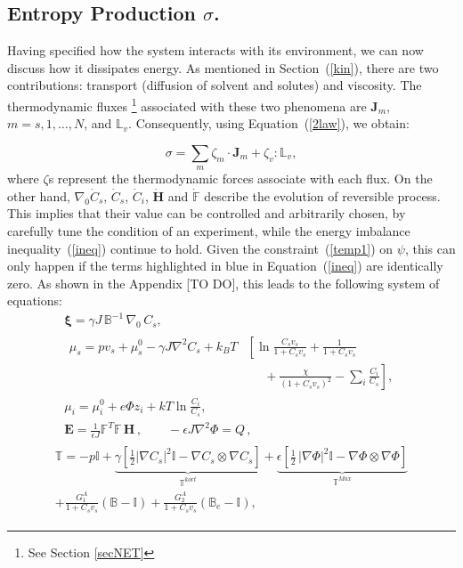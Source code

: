 \documentclass[runningheads]{llncs}
\newcommand{\F}{\ensuremath{\mathbb{F}}}
\newcommand{\LL}{\ensuremath{\mathbb{L}}}
\begin{document}
\subsection{Entropy Production $\sigma$.}
\label{ent}

Having specified how the system interacts with its environment, we can now discuss how it dissipates energy. As mentioned in Section~(\ref{kin}), there are two contributions: transport (diffusion of solvent and solutes) and viscosity. The thermodynamic fluxes \footnote{See Section \ref{secNET}} associated with these two phenomena are $\mathbf{J}_m$, $m=s,1,\ldots,N$, and $\LL_v$. Consequently, using Equation~(\ref{2law}), we obtain:

\begin{equation}
\sigma = \sum_m \zeta_m \cdot \mathbf{J}_m + \zeta_v : \LL_v,
\label{dis}
\end{equation}
where $\zeta$s represent the thermodynamic forces associate with each flux. On the other hand, $\nabla_0 \dot{C}_s$, $\dot{C}_s$, $\dot{C}_i$, $\mathbf{\dot{H}}$ and $\dot{\F}$ describe the evolution of reversible process. This implies that their value can be controlled and arbitrarily chosen, by carefully tune the condition of an experiment, while the energy imbalance inequality~(\ref{ineq}) continue to hold. Given the constraint~(\ref{temp1}) on $\psi$, this can only happen if the terms highlighted in blue in Equation~(\ref{ineq}) are identically zero. As shown in the Appendix [TO DO], this leads to the following system of equations:
\begin{gather}
\boldsymbol{\xi} = \gamma J \,\mathbb{B}^{-1} \,\nabla_0 \,C_s,\label{sys1}\\[2mm]
\begin{aligned}
\mu_s = p v_s + \mu_s^0 - \gamma J \nabla^2 C_s + k_BT&\left[\ln \frac{C_s v_s}{1+C_s v_s} + \frac{1}{1+C_sv_s}\right.\\
&\left.\ \ \ \ \ \ +\frac{\chi}{(1+C_s v_s)^2}-\sum_i \frac{C_i}{C_s}\right], 
\end{aligned}\label{gov1}\\[2.5mm]
\mu_i = \mu^0_i + e\Phi z_i + kT \ln \frac{C_i}{C_s},\label{mu}\\
\mathbf{E} = \frac{1}{\epsilon J} \F^T \F\, \mathbf{H}\, , \qquad -\epsilon J \nabla^2 \Phi = Q\, ,\label{sys2}
\end{gather}
\begin{gather}
\begin{aligned}
\mathbb{T}= -p \mathbb{I} + \underbrace{\gamma \left[\frac{1}{2} |\nabla C_s|^2\mathbb{I} - \nabla C_s \otimes \nabla C_s\right]}_{\mathbb{T}^{kort}}+ \underbrace{\epsilon \left[\frac{1}{2} \,|\nabla \Phi|^2\mathbb{I} -\nabla \Phi \otimes \nabla \Phi\right]}_{\mathbb{T}^{Max}}\\
+ \frac{G^A_1}{1+C_sv_s}\left(\mathbb{B}-\mathbb{I}\right) + \frac{G^A_2}{1+C_sv_s}\left(\mathbb{B}_e-\mathbb{I}\right),
\end{aligned}
\label{sys3}
\end{gather}
\end{document}
